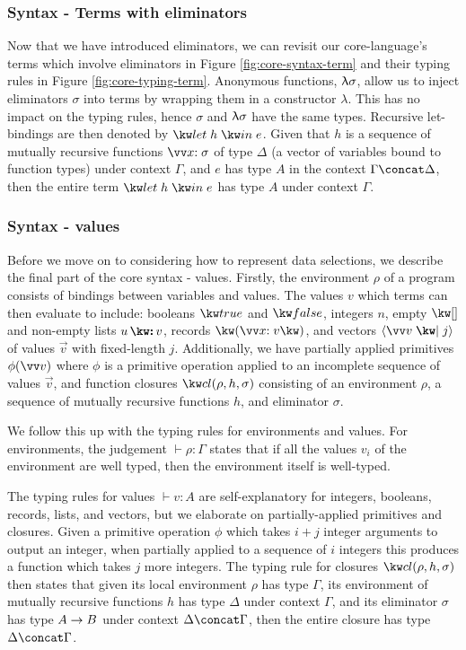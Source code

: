 \subsubsection{Syntax - Terms with eliminators}
\label{sssec:syntax-eliminator-terms}
Now that we have introduced eliminators, we can revisit our core-language's terms which involve eliminators in Figure \ref{fig:core-syntax-term} and their typing rules in Figure \ref{fig:core-typing-term}. Anonymous functions, $\uplambda{\sigma}$, allow us to inject eliminators $\sigma$ into terms by wrapping them in a constructor $\lambda$. This has no impact on the typing rules, hence $\sigma$ and $\uplambda{\sigma}$ have the same types. Recursive let-bindings are then denoted by $\exLetRecMutual{h}{e}$. Given that $h$ is a sequence of mutually recursive functions $\vec{\bind{x}{\sigma}}$ of type $\Delta$ (a vector of variables bound to function types) under context $\Gamma$, and $e$ has type $A$ in the context $\Gamma \concat \Delta$, then the entire term $\exLetRecMutual{h}{e}$ has type $A$ under context $\Gamma$. 

\subsubsection{Syntax - values}
Before we move on to considering how to represent data selections, we describe the final part of the core syntax - values. Firstly, the environment $\rho$ of a program consists of bindings between variables and values. The values $v$ which terms can then evaluate to include: booleans $\exTrue$ and $\exFalse$, integers $n$, empty $\exNil$ and non-empty lists $\exCons{u}{v}$, records $\exRec{\vec{\bind{x}{v}}}$, and vectors $\exVecVal{\vec{v}}{j}$ of values $\vec{v}$ with fixed-length $j$. Additionally, we have partially applied primitives $\exPrimOp{\phi}{\vec{v}}$ where $\phi$ is a primitive operation applied to an incomplete sequence of values $\vec{v}$, and function closures $\exClosure{\rho}{h}{\sigma}$ consisting of an environment $\rho$, a sequence of mutually recursive functions $h$, and eliminator $\sigma$. 


\noindent
We follow this up with the typing rules for environments and values. For environments, the judgement $\vdash \rho: \Gamma$ states that if all the values $v_i$ of the environment are well typed, then the environment itself is well-typed. 

The typing rules for values $\vdash v: A$ are self-explanatory for integers, booleans, records, lists, and vectors, but we elaborate on partially-applied primitives and closures. Given a primitive operation $\phi$ which takes $i+j$ integer arguments to output an integer, when partially applied to a sequence of $i$ integers this produces a function which takes $j$ more integers. The typing rule for closures $\exClosure{\rho}{h}{\sigma}$ then states that given its local environment $\rho$ has type $\Gamma$, its environment of mutually recursive functions $h$ has type $\Delta$ under context $\Gamma$, and its eliminator $\sigma$ has type ${A}\rightarrow{B}$ under context $\Delta \concat \Gamma$, then the entire closure has type $\Delta \concat \Gamma$.

